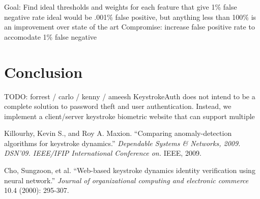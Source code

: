 \documentclass{article}
\begin{document}
Goal: Find ideal thresholds and weights for each feature that give 1\% false negative rate
ideal would be  .001\% false positive, but anything less than 100\% is an improvement over state of the art
Compromise: increase false positive rate to accomodate 1\% false negative

\section{Conclusion}
TODO: forrest / carlo / kenny / ameesh
KeystrokeAuth does not intend to be a complete solution to password theft and user authentication. Instead, we implement a client/server keystroke biometric website that can support multiple

\begin{thebibliography}{99}
   Killourhy, Kevin S., and Roy A. Maxion. 
   ``Comparing anomaly-detection algorithms for keystroke dynamics.''
   \textit{Dependable Systems \& Networks, 2009. DSN'09. IEEE/IFIP International Conference on.}
   IEEE, 2009. 
 
   Cho, Sungzoon, et al.
   ``Web-based keystroke dynamics identity verification using neural network.'' 
   \textit{Journal of organizational computing and electronic commerce}
   10.4 (2000): 295-307.
  
\end{thebibliography}
\end{document}
